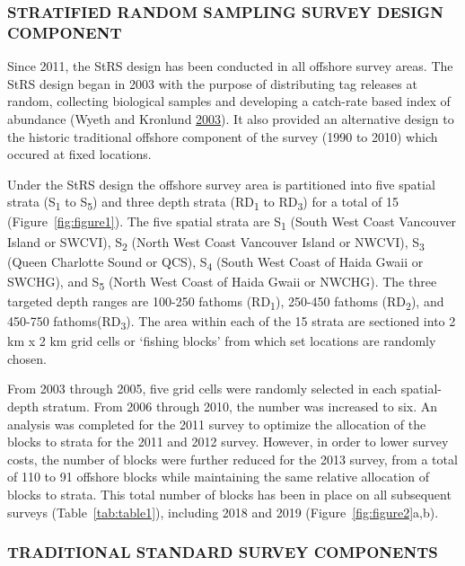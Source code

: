 \documentclass[12pt]{article}\usepackage[]{graphicx}\usepackage[]{color}
\begin{document}
\hypertarget{stratified-random-sampling-survey-design-component}{%
\subsubsection{STRATIFIED RANDOM SAMPLING SURVEY DESIGN COMPONENT}\label{stratified-random-sampling-survey-design-component}}

Since 2011, the StRS design has been conducted in all offshore survey areas. The StRS design began in 2003 with the purpose of distributing tag releases at random, collecting biological samples and developing a catch-rate based index of abundance (Wyeth and Kronlund \protect\hyperlink{ref-Wyeth2003}{2003}). It also provided an alternative design to the historic traditional offshore component of the survey (1990 to 2010) which occured at fixed locations.

Under the StRS design the offshore survey area is partitioned into five spatial strata (S\textsubscript{1} to S\textsubscript{5}) and three depth strata (RD\textsubscript{1} to RD\textsubscript{3}) for a total of 15 (Figure~\ref{fig:figure1}). The five spatial strata are S\textsubscript{1} (South West Coast Vancouver Island or SWCVI), S\textsubscript{2} (North West Coast Vancouver Island or NWCVI), S\textsubscript{3} (Queen Charlotte Sound or QCS), S\textsubscript{4} (South West Coast of Haida Gwaii or SWCHG), and S\textsubscript{5} (North West Coast of Haida Gwaii or NWCHG). The three targeted depth ranges are 100-250 fathoms (RD\textsubscript{1}), 250-450 fathoms (RD\textsubscript{2}), and 450-750 fathoms(RD\textsubscript{3}). The area within each of the 15 strata are sectioned into 2 km x 2 km grid cells or `fishing blocks' from which set locations are randomly chosen.

From 2003 through 2005, five grid cells were randomly selected in each spatial-depth stratum. From 2006 through 2010, the number was increased to six. An analysis was completed for the 2011 survey to optimize the allocation of the blocks to strata for the 2011 and 2012 survey. However, in order to lower survey costs, the number of blocks were further reduced for the 2013 survey, from a total of 110 to 91 offshore blocks while maintaining the same relative allocation of blocks to strata. This total number of blocks has been in place on all subsequent surveys (Table~\ref{tab:table1}), including 2018 and 2019 (Figure~\ref{fig:figure2}a,b).

\hypertarget{traditional-standard-survey-components}{%
\subsubsection{TRADITIONAL STANDARD SURVEY COMPONENTS}\label{traditional-standard-survey-components}}
\end{document}
